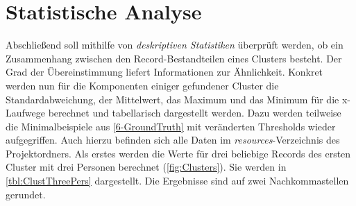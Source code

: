 \section{Statistische Analyse}
\label{6-Statistical}
Abschließend soll mithilfe von \emph{deskriptiven Statistiken} überprüft werden,
ob ein Zusammenhang zwischen den Record-Bestandteilen eines Clusters besteht.
Der Grad der Übereinstimmung liefert Informationen zur Ähnlichkeit.
Konkret werden nun für die Komponenten einiger gefundener Cluster
die Standardabweichung, der Mittelwert, das Maximum und das Minimum für die x-Laufwege berechnet
und tabellarisch dargestellt werden.
Dazu werden teilweise die Minimalbeispiele aus \autoref{6-GroundTruth} mit veränderten Thresholds wieder aufgegriffen.
Auch hierzu befinden sich alle Daten im \emph{resources}-Verzeichnis des Projektordners.
Als erstes werden die Werte für drei beliebige Records des ersten Cluster mit drei Personen berechnet (\autoref{fig:Clusters}).
Sie werden in \autoref{tbl:ClustThreePers} dargestellt.
Die Ergebnisse sind auf zwei Nachkommastellen gerundet.
